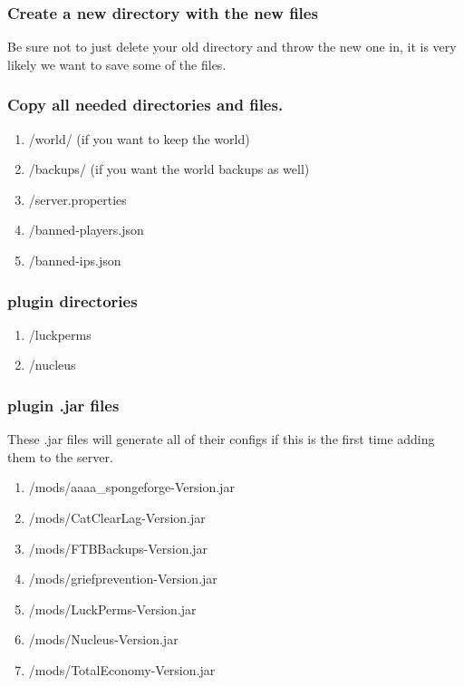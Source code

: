 \documentclass{article}
\begin{document}
\subsubsection{Create a new directory with the new files}
Be sure not to just delete your old directory and throw the new one in, it is very likely we want to save some of the files.

\subsubsection{Copy all needed directories and files.}
\begin{enumerate}
	\item /world/ (if you want to keep the world)
	\item /backups/ (if you want the world backups as well)
	\item /server.properties
	\item /banned-players.json
	\item /banned-ips.json
\end{enumerate}

\subsubsection{plugin directories}
\begin{enumerate}
	\item /luckperms
	\item /nucleus
\end{enumerate}

\subsubsection{plugin .jar files}
These .jar files will generate all of their configs if this is the first time adding them to the server.
\begin{enumerate}
	\item /mods/aaaa\_spongeforge-Version.jar
	\item /mods/CatClearLag-Version.jar
	\item /mods/FTBBackups-Version.jar
	\item /mods/griefprevention-Version.jar
	\item /mods/LuckPerms-Version.jar
	\item /mods/Nucleus-Version.jar
	\item /mods/TotalEconomy-Version.jar
\end{enumerate}
\end{document}
